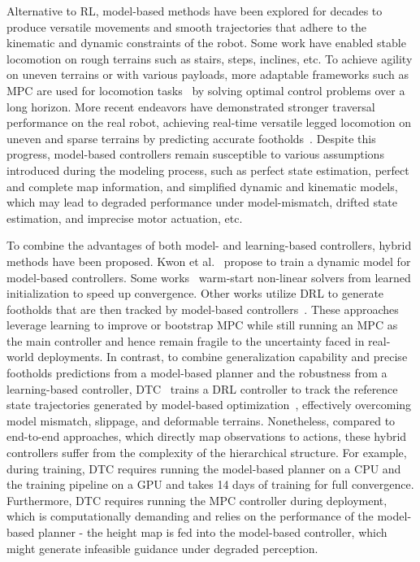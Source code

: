 \documentclass[9pt,twocolumn,twoside]{osajnl}
\begin{document}
Alternative to RL, model-based methods have been explored for decades to produce versatile movements and smooth trajectories that adhere to the kinematic and dynamic constraints of the robot.
Some work \cite{little_dog, Fankhauser2018} have enabled stable locomotion on rough terrains such as stairs, steps, inclines, etc. To achieve agility on uneven terrains or with various payloads, more adaptable frameworks such as MPC are used for locomotion tasks~\cite{6095035, Neunert2016FastNM,  Farshidian2017RealtimeMP, 8594448, SRBD_MPC} by solving optimal control problems over a long horizon. More recent endeavors have demonstrated stronger traversal performance on the real robot, achieving real-time versatile legged locomotion on uneven and sparse terrains by predicting accurate footholds~\cite{Mastalli2022, Ruben2022, Jenelten2022}. 
Despite this progress, model-based controllers remain susceptible to various assumptions introduced during the modeling process, such as perfect state estimation, perfect and complete map information, and simplified dynamic and kinematic models, which may lead to degraded performance under model-mismatch, drifted state estimation, and imprecise motor actuation, etc. 

To combine the advantages of both model- and learning-based controllers, hybrid methods have been proposed. Kwon et al.~\cite{Kwon2020} propose to train a dynamic model for model-based controllers. Some works~\cite{towr_learning, Surovik2021, Melon2021} warm-start non-linear solvers from learned initialization to speed up convergence. Other works utilize DRL to generate footholds that are then tracked by model-based controllers~\cite{RLOC, glide}. These approaches leverage learning to improve or bootstrap MPC while still running an MPC as the main controller and hence remain fragile to the uncertainty faced in real-world deployments. In contrast, to combine generalization capability and precise footholds predictions from a model-based planner and the robustness from a learning-based controller, DTC~\cite{jenelten2023dtc} trains a DRL controller to track the reference state trajectories generated by model-based optimization~\cite{Jenelten2022}, effectively overcoming model mismatch, slippage, and deformable terrains. Nonetheless, compared to end-to-end approaches, which directly map observations to actions, these hybrid controllers suffer from the complexity of the hierarchical structure. For example, during training, DTC requires running the model-based planner on a CPU and the training pipeline on a GPU and takes 14 days of training for full convergence. Furthermore, DTC requires running the MPC controller during deployment, which is computationally demanding and relies on the performance of the model-based planner - the height map is fed into the model-based controller, which might generate infeasible guidance under degraded perception.
\end{document}
